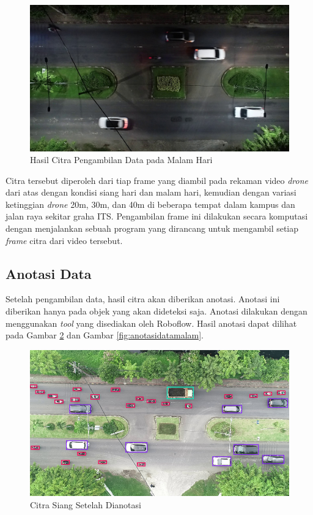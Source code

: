 \begin{figure} [H] \centering
  \includegraphics[scale=0.225]{bab3/citramalam.jpg}
  \caption{Hasil Citra Pengambilan Data pada Malam Hari}
  \label{fig:datacitra_malam}
\end{figure}

Citra tersebut diperoleh dari tiap frame yang diambil pada rekaman video \emph{drone} dari atas dengan kondisi siang hari dan malam hari, kemudian dengan variasi ketinggian \emph{drone} 20m, 30m, dan 40m di beberapa tempat dalam kampus dan jalan raya sekitar graha ITS. Pengambilan frame ini dilakukan secara komputasi dengan menjalankan sebuah program yang dirancang untuk mengambil setiap \emph{frame} citra dari video tersebut.

\subsection{Anotasi Data}
Setelah pengambilan data, hasil citra akan diberikan anotasi. Anotasi ini diberikan hanya pada objek yang akan dideteksi saja. Anotasi dilakukan dengan menggunakan \emph{tool} yang disediakan oleh Roboflow. Hasil anotasi dapat dilihat pada Gambar \ref{fig:anotasidatasiang} dan Gambar \ref{fig:anotasidatamalam}.

\begin{figure} [H] \centering
  \includegraphics[scale=0.5]{bab3/anotasidatasiang.png}
  \caption{Citra Siang Setelah Dianotasi}
  \label{fig:anotasidatasiang}
\end{figure}


